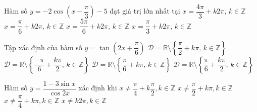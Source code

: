 \begin{ex}%
	 Hàm số $y=-2\cos\left(x-\dfrac{\pi}{3}\right)-5$ đạt giá trị lớn nhất tại
	 \choice
		{\True  $x=\dfrac{4\pi}{3}+k2\pi,\,k\in\mathbb{Z}$}
		{$x=\dfrac{\pi}{6}+k2\pi,\,k\in\mathbb{Z}$} 
		{$x=\dfrac{5\pi}{6}+k2\pi,\,k\in\mathbb{Z}$} 
		 {$x=\dfrac{\pi}{3}+k2\pi,\,k\in\mathbb{Z}$}
\end{ex}

\begin{ex}%
	Tập xác định của hàm số  $y=\tan \left( 2x+\dfrac{\pi }{6} \right)$
	 \choice
		{$\mathscr{D}=\mathbb{R}\setminus \left\{ \dfrac{\pi }{2}+k\pi ,\,k\in \mathbb{Z} \right\}$} 
		{$\mathscr{D}=\mathbb{R}\setminus \left\{ \dfrac{-\pi }{6}+\dfrac{k\pi }{2},\,k\in \mathbb{Z} \right\}$} 
		{$\mathscr{D}=\mathbb{R}\setminus \left\{ \dfrac{\pi }{6}+k\pi ,\,k\in  \mathbb{Z} \right\}$}
		{\True $\mathscr{D}=\mathbb{R}\setminus \left\{ \dfrac{\pi }{6}+\dfrac{k\pi }{2},\,k\in \mathbb{Z}  \right\}$}
\end{ex}

\begin{ex}%
	Hàm số $y=\dfrac{1-3\sin x}{\cos 2x}$ xác  định khi
	\choice 
		 {\True $x\neq \dfrac{\pi }{4}+k\dfrac{\pi }{2},k\in \mathbb{Z}$}
		 {$x\neq \dfrac{\pi }{2}+k\pi ,k\in \mathbb{Z}$}
		{$x\neq \dfrac{\pi }{4}+k\pi ,k\in  \mathbb{Z}$}
		{$x\neq k2\pi ,k\in  \mathbb{Z}$}
\end{ex}

